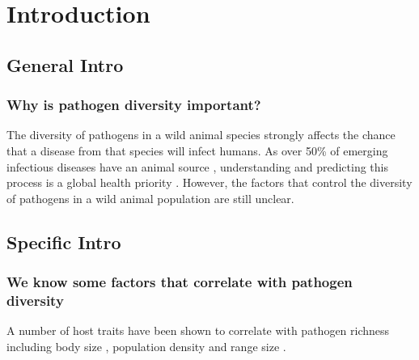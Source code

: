 
\clearpage
\section{Introduction}





\subsection{General Intro}


\subsubsection{Why is pathogen diversity important?}

The diversity of pathogens in a wild animal species strongly affects the chance that a disease from that species will infect humans.
As over 50\% of emerging infectious diseases have an animal source  \cite{jones2008global}, understanding and predicting this process is a global health priority  \cite{taylor2001risk}.
However, the factors that control the diversity of pathogens in a wild animal population are still unclear.






\subsection{Specific Intro}


\subsubsection{We know some factors that correlate with pathogen diversity}
A number of host traits have been shown to correlate with pathogen richness including body size  \cite{kamiya2014determines, arneberg2002host}, population density \cite{nunn2003comparative, arneberg2002host} and range size \cite{bordes2011impact, kamiya2014determines}.




